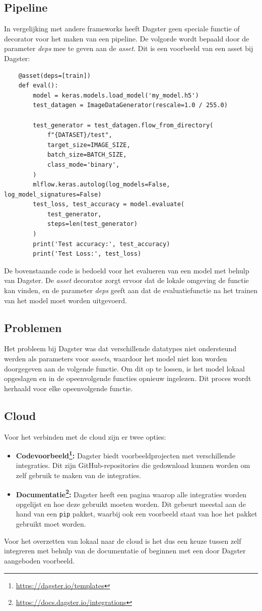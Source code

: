 \subsection{Pipeline}
In vergelijking met andere frameworks heeft Dagster geen speciale functie of decorator voor het maken van een pipeline. De volgorde wordt bepaald door de parameter \textit{deps} mee te geven aan de \textit{asset}.
Dit is een voorbeeld van een asset bij Dagster:
\begin{verbatim}
    @asset(deps=[train])
    def eval():
        model = keras.models.load_model('my_model.h5')
        test_datagen = ImageDataGenerator(rescale=1.0 / 255.0)

        test_generator = test_datagen.flow_from_directory(
            f"{DATASET}/test",
            target_size=IMAGE_SIZE,
            batch_size=BATCH_SIZE,
            class_mode='binary',
        )
        mlflow.keras.autolog(log_models=False, log_model_signatures=False)
        test_loss, test_accuracy = model.evaluate(
            test_generator,
            steps=len(test_generator)
        )
        print('Test accuracy:', test_accuracy)
        print('Test Loss:', test_loss)
\end{verbatim}
De bovenstaande code is bedoeld voor het evalueren van een model met behulp van Dagster. De \textit{asset} decorator zorgt ervoor dat de lokale omgeving de functie kan vinden, en de parameter \textit{deps} geeft aan dat de evaluatiefunctie na het trainen van het model moet worden uitgevoerd.
\subsection{Problemen}
Het probleem bij Dagster was dat verschillende datatypes niet ondersteund werden als parameters voor \textit{assets}, waardoor het model niet kon worden doorgegeven aan de volgende functie. Om dit op te lossen, is het model lokaal opgeslagen en in de opeenvolgende functies opnieuw ingelezen. Dit proces wordt herhaald voor elke opeenvolgende functie.
\subsection{Cloud}
Voor het verbinden met de cloud zijn er twee opties:
\begin{itemize}
    \item \textbf{Codevoorbeeld\footnote{\url{https://dagster.io/templates}}:} Dagster biedt voorbeeldprojecten met verschillende integraties. Dit zijn GitHub-repositories die gedownload kunnen worden om zelf gebruik te maken van de integraties.
    \item \textbf{Documentatie\footnote{\url{https://docs.dagster.io/integrations}}:} Dagster heeft een pagina waarop alle integraties worden opgelijst en hoe deze gebruikt moeten worden. Dit gebeurt meestal aan de hand van een \texttt{pip} pakket, waarbij ook een voorbeeld staat van hoe het pakket gebruikt moet worden.
\end{itemize}

Voor het overzetten van lokaal naar de cloud is het dus een keuze tussen zelf integreren met behulp van de documentatie of beginnen met een door Dagster aangeboden voorbeeld.
